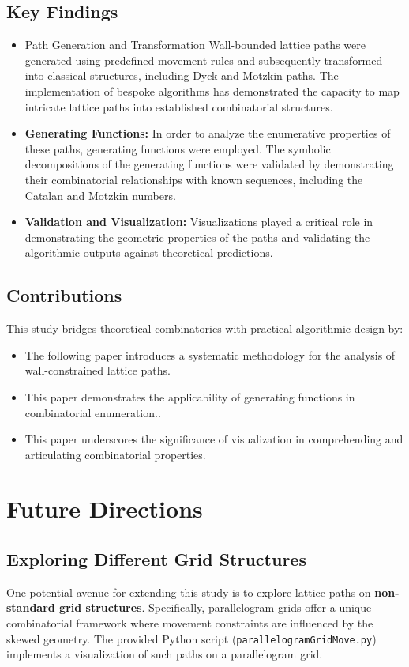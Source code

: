 \documentclass{article}
\begin{document}
\subsection{Key Findings}
\begin{itemize}
    \item Path Generation and Transformation Wall-bounded lattice paths were generated using predefined movement rules and subsequently transformed into classical structures, including Dyck and Motzkin paths. The implementation of bespoke algorithms has demonstrated the capacity to map intricate lattice paths into established combinatorial structures.
    \item \textbf{Generating Functions:} In order to analyze the enumerative properties of these paths, generating functions were employed. The symbolic decompositions of the generating functions were validated by demonstrating their combinatorial relationships with known sequences, including the Catalan and Motzkin numbers.
    \item \textbf{Validation and Visualization:} Visualizations played a critical role in demonstrating the geometric properties of the paths and validating the algorithmic outputs against theoretical predictions.
\end{itemize}

\subsection{Contributions}
This study bridges theoretical combinatorics with practical algorithmic design by:
\begin{itemize}
    \item The following paper introduces a systematic methodology for the analysis of wall-constrained lattice paths.
    \item This paper demonstrates the applicability of generating functions in combinatorial enumeration..
    \item This paper underscores the significance of visualization in comprehending and articulating combinatorial properties.
\end{itemize}

\section{Future Directions}

\subsection{Exploring Different Grid Structures}
One potential avenue for extending this study is to explore lattice paths on \textbf{non-standard grid structures}. Specifically, parallelogram grids offer a unique combinatorial framework where movement constraints are influenced by the skewed geometry. The provided Python script (\texttt{parallelogramGridMove.py}) implements a visualization of such paths on a parallelogram grid.
\end{document}
